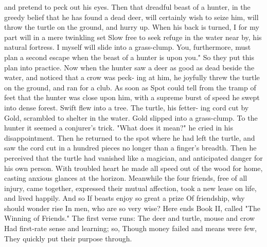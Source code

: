 \documentclass{book}
\begin{document}
and pretend to peck out his eyes. Then that dreadful
beast of a hunter, in the greedy belief that he has
found a dead deer, will certainly wish to seize him,
will throw the turtle on the ground, and hurry up.
When his back is turned, I for my part will in a mere
twinkling set Slow free to seek refuge in the water
near by, his natural fortress. I myself will slide into
a grass-clump. You, furthermore, must plan a second
escape when the beast of a hunter is upon you." So
they put this plan into practice.
Now when the hunter saw a deer as good as dead
beside the water, and noticed that a crow was peck-
ing at him, he joyfully threw the turtle on the ground,
and ran for a club. As soon as Spot could tell from
the tramp of feet that the hunter was close upon him,
with a supreme burst of speed he swept into dense
forest. Swift flew into a tree. The turtle, his fetter-
ing cord cut by Gold, scrambled to shelter in the
water. Gold slipped into a grass-clump.
To the hunter it seemed a conjurer's trick.
"What does it mean?" he cried in his disappointment.
Then he returned to the spot where he had left the
turtle, and saw the cord cut in a hundred pieces no
longer than a finger's breadth. Then he perceived
that the turtle had vanished like a magician, and
anticipated danger for his own person. With troubled
heart he made all speed out of the wood for home,
casting anxious glances at the horizon.
Meanwhile the four friends, free of all injury, came
together, expressed their mutual affection, took a new
lease on life, and lived happily. And so
If beasts enjoy so great a prize
Of friendship, why should wonder rise
In men, who are so very wise?
Here ends Book II, called "The Winning of
Friends." The first verse runs:
The deer and turtle, mouse and crow
Had first-rate sense and learning; so,
Though money failed and means were few,
They quickly put their purpose through.
\end{document}
